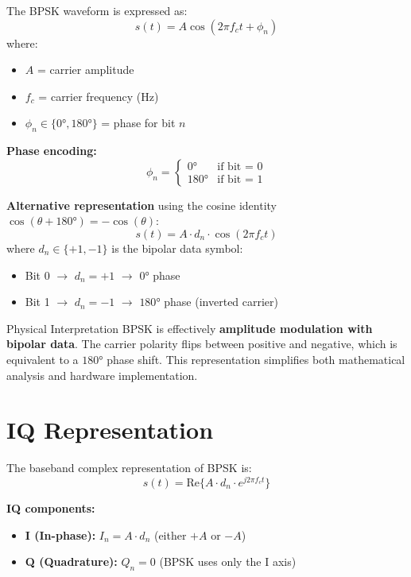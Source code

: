 The BPSK waveform is expressed as:
\begin{equation}
s(t) = A \cos(2\pi f_c t + \phi_n)
\end{equation}
where:
\begin{itemize}
\item $A$ = carrier amplitude
\item $f_c$ = carrier frequency (Hz)
\item $\phi_n \in \{0°, 180°\}$ = phase for bit $n$
\end{itemize}

\textbf{Phase encoding:}
\begin{equation}
\phi_n = \begin{cases}
0° & \text{if bit = 0} \\
180° & \text{if bit = 1}
\end{cases}
\end{equation}

\textbf{Alternative representation} using the cosine identity $\cos(\theta + 180°) = -\cos(\theta)$:
\begin{equation}
s(t) = A \cdot d_n \cdot \cos(2\pi f_c t)
\end{equation}
where $d_n \in \{+1, -1\}$ is the bipolar data symbol:
\begin{itemize}
\item Bit 0 $\rightarrow$ $d_n = +1$ $\rightarrow$ $0°$ phase
\item Bit 1 $\rightarrow$ $d_n = -1$ $\rightarrow$ $180°$ phase (inverted carrier)
\end{itemize}

\begin{calloutbox}{Physical Interpretation}
BPSK is effectively \textbf{amplitude modulation with bipolar data}. The carrier polarity flips between positive and negative, which is equivalent to a $180°$ phase shift. This representation simplifies both mathematical analysis and hardware implementation.
\end{calloutbox}

\section{IQ Representation}

The baseband complex representation of BPSK is:
\begin{equation}
s(t) = \mathrm{Re}\{A \cdot d_n \cdot e^{j2\pi f_c t}\}
\end{equation}

\textbf{IQ components:}
\begin{itemize}
\item \textbf{I (In-phase):} $I_n = A \cdot d_n$ (either $+A$ or $-A$)
\item \textbf{Q (Quadrature):} $Q_n = 0$ (BPSK uses only the I axis)
\end{itemize}

